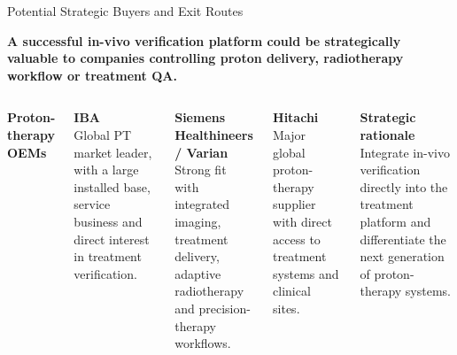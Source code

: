 \documentclass[aspectratio=169,11pt]{beamer}
\begin{document}


\begin{frame}{Potential Strategic Buyers and Exit Routes}

\vspace{0.05cm}

\begin{center}
\scriptsize\bfseries
A successful in-vivo verification platform could be strategically valuable
to companies controlling proton delivery, radiotherapy workflow or treatment QA.
\end{center}

\vspace{0.25cm}

\begin{columns}[T,onlytextwidth]


\scriptsize\bfseries\color{PTblue}
Proton-therapy OEMs

\vspace{0.12cm}

\tiny\color{black}

\textbf{IBA}\\

Global PT market leader, with a large installed base,
service business and direct interest in treatment verification.

\vspace{0.15cm}

\textbf{Siemens Healthineers / Varian}\\
Strong fit with integrated imaging, treatment delivery,
adaptive radiotherapy and precision-therapy workflows.

\vspace{0.15cm}

\textbf{Hitachi}\\
Major global proton-therapy supplier with direct access
to treatment systems and clinical sites.

\vspace{0.25cm}

\textbf{Strategic rationale}\\
Integrate in-vivo verification directly into the treatment platform
and differentiate the next generation of proton-therapy systems.




\end{columns}
\end{frame}
\end{document}
